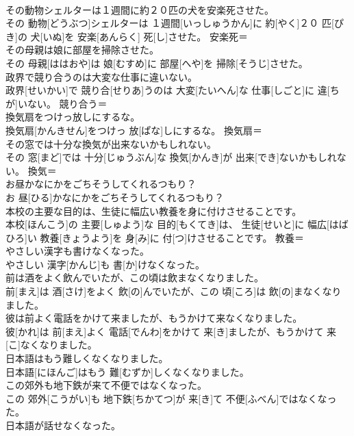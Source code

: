 \documentclass[8pt]{extreport}
\begin{document}
\begin{CJK}{UTF8}{min}
\\	その動物シェルターは１週間に約２０匹の犬を安楽死させた。	
\\	その 動物[どうぶつ]シェルターは １週間[いっしゅうかん]に 約[やく]２０ 匹[ぴき]の 犬[いぬ]を 安楽[あんらく] 死[し]させた。	安楽死＝ 
\\	その母親は娘に部屋を掃除させた。	
\\	その 母親[ははおや]は 娘[むすめ]に 部屋[へや]を 掃除[そうじ]させた。	
\\	政界で競り合うのは大変な仕事に違いない。	
\\	政界[せいかい]で 競り合[せりあ]うのは 大変[たいへん]な 仕事[しごと]に 違[ちが]いない。	競り合う＝ 
\\	換気扇をつけっ放しにするな。	
\\	換気扇[かんきせん]をつけっ 放[ぱな]しにするな。	換気扇＝ 
\\	その窓では十分な換気が出来ないかもしれない。	
\\	その 窓[まど]では 十分[じゅうぶん]な 換気[かんき]が 出来[でき]ないかもしれない。	換気＝ 
\\	お昼かなにかをごちそうしてくれるつもり？	
\\	お 昼[ひる]かなにかをごちそうしてくれるつもり？	
\\	本校の主要な目的は、生徒に幅広い教養を身に付けさせることです。	
\\	本校[ほんこう]の 主要[しゅよう]な 目的[もくてき]は、 生徒[せいと]に 幅広[はばひろ]い 教養[きょうよう]を 身[み]に 付[つ]けさせることです。	教養＝ 
\\	やさしい漢字も書けなくなった。	
\\	やさしい 漢字[かんじ]も 書[か]けなくなった。	
\\	前は酒をよく飲んでいたが、この頃は飲まなくなりました。	
\\	前[まえ]は 酒[さけ]をよく 飲[の]んでいたが、この 頃[ころ]は 飲[の]まなくなりました。	
\\	彼は前よく電話をかけて来ましたが、もうかけて来なくなりました。	
\\	彼[かれ]は 前[まえ]よく 電話[でんわ]をかけて 来[き]ましたが、もうかけて 来[こ]なくなりました。	
\\	日本語はもう難しくなくなりました。	
\\	日本語[にほんご]はもう 難[むずか]しくなくなりました。	
\\	この郊外も地下鉄が来て不便ではなくなった。	
\\	この 郊外[こうがい]も 地下鉄[ちかてつ]が 来[き]て 不便[ふべん]ではなくなった。	
\\	日本語が話せなくなった。	

\end{CJK}
\end{document}
